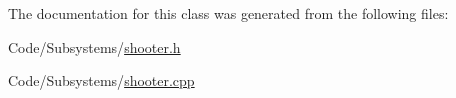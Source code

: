 \-The documentation for this class was generated from the following files\-:\begin{DoxyCompactItemize}
\item 
\-Code/\-Subsystems/\hyperlink{shooter_8h}{shooter.\-h}\item 
\-Code/\-Subsystems/\hyperlink{shooter_8cpp}{shooter.\-cpp}\end{DoxyCompactItemize}
